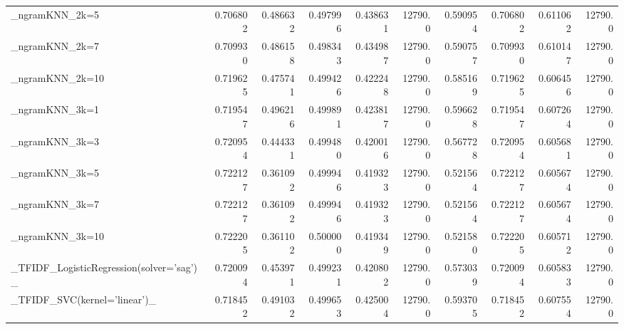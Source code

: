 \begin{tabular}{lrrrrrrrrr}
\_ngramKNN\_2k=5                                     &  0.706802 &         0.486632 &      0.497996 &        0.438631 &        12790.0 &            0.590954 &         0.706802 &           0.611062 &           12790.0 \\
\_ngramKNN\_2k=7                                     &  0.709930 &         0.486158 &      0.498343 &        0.434987 &        12790.0 &            0.590757 &         0.709930 &           0.610147 &           12790.0 \\
\_ngramKNN\_2k=10                                    &  0.719625 &         0.475741 &      0.499426 &        0.422248 &        12790.0 &            0.585169 &         0.719625 &           0.606456 &           12790.0 \\
\_ngramKNN\_3k=1                                     &  0.719547 &         0.496216 &      0.499891 &        0.423817 &        12790.0 &            0.596628 &         0.719547 &           0.607264 &           12790.0 \\
\_ngramKNN\_3k=3                                     &  0.720954 &         0.444331 &      0.499480 &        0.420016 &        12790.0 &            0.567728 &         0.720954 &           0.605681 &           12790.0 \\
\_ngramKNN\_3k=5                                     &  0.722127 &         0.361092 &      0.499946 &        0.419323 &        12790.0 &            0.521564 &         0.722127 &           0.605674 &           12790.0 \\
\_ngramKNN\_3k=7                                     &  0.722127 &         0.361092 &      0.499946 &        0.419323 &        12790.0 &            0.521564 &         0.722127 &           0.605674 &           12790.0 \\
\_ngramKNN\_3k=10                                    &  0.722205 &         0.361102 &      0.500000 &        0.419349 &        12790.0 &            0.521580 &         0.722205 &           0.605712 &           12790.0 \\
\_TFIDF\_LogisticRegression(solver='sag')\_           &  0.720094 &         0.453971 &      0.499231 &        0.420802 &        12790.0 &            0.573039 &         0.720094 &           0.605833 &           12790.0 \\
\_TFIDF\_SVC(kernel='linear')\_                       &  0.718452 &         0.491032 &      0.499653 &        0.425004 &        12790.0 &            0.593705 &         0.718452 &           0.607554 &           12790.0 \\

\end{tabular}
